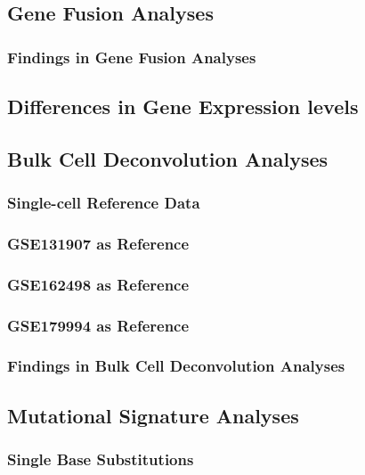 \documentclass[11pt,a4paper,onecolumn,oneside]{report}
\begin{document}
        \subsection{Gene Fusion Analyses}
            \subsubsection{Findings in Gene Fusion Analyses}

        \subsection{Differences in Gene Expression levels}

        \subsection{Bulk Cell Deconvolution Analyses}
            \subsubsection{Single-cell Reference Data}

            \subsubsection{GSE131907 as Reference}

            \subsubsection{GSE162498 as Reference}

            \subsubsection{GSE179994 as Reference}

            \subsubsection{Findings in Bulk Cell Deconvolution Analyses}

        \subsection{Mutational Signature Analyses}
            \subsubsection{Single Base Substitutions}
\end{document}

